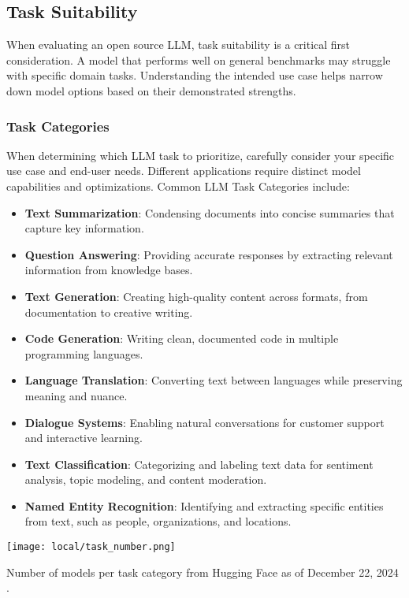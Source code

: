 \subsection{Task Suitability}

When evaluating an open source LLM, task suitability is a critical first consideration. A model that performs well on general benchmarks may struggle with specific domain tasks. Understanding the intended use case helps narrow down model options based on their demonstrated strengths.

\subsubsection{Task Categories}

When determining which LLM task to prioritize, carefully consider your specific use case and end-user needs. Different applications require distinct model capabilities and optimizations. Common LLM Task Categories include:
\begin{itemize}
    \item \textbf{Text Summarization}: Condensing documents into concise summaries that capture key information.
    \item \textbf{Question Answering}: Providing accurate responses by extracting relevant information from knowledge bases.
    \item \textbf{Text Generation}: Creating high-quality content across formats, from documentation to creative writing.
    \item \textbf{Code Generation}: Writing clean, documented code in multiple programming languages.
    \item \textbf{Language Translation}: Converting text between languages while preserving meaning and nuance.
    \item \textbf{Dialogue Systems}: Enabling natural conversations for customer support and interactive learning.
    \item \textbf{Text Classification}: Categorizing and labeling text data for sentiment analysis, topic modeling, and content moderation.
    \item \textbf{Named Entity Recognition}: Identifying and extracting specific entities from text, such as people, organizations, and locations.
\end{itemize}
\begin{marginfigure}
\centering
\texttt{[image: local/task\_number.png]}
\caption{Number of models per task category from Hugging Face as of December 22, 2024 \cite{hf2024yearinreview}.}
\label{fig:task_number}
\end{marginfigure}

